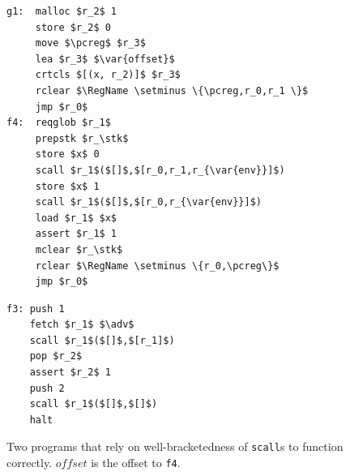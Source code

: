 \documentclass[acmsmall,review]{acmart}\settopmatter{printfolios=true}
\newcommand{\var}[1]{\mathit{#1}}
\newcommand{\pcreg}{\mathrm{pc}}
\newcommand{\adv}{\var{adv}}
\newcommand{\stk}{\var{stk}}
\newcommand{\plaindom}[1]{\mathrm{#1}}
\newcommand{\RegName}{\plaindom{RegName}}
\begin{document}

\begin{figure}[t]
  \centering
  \begin{minipage}[t]{5.05cm}
  \begin{lstlisting}
g1:  malloc $r_2$ 1
     store $r_2$ 0
     move $\pcreg$ $r_3$
     lea $r_3$ $\var{offset}$
     crtcls $[(x, r_2)]$ $r_3$
     rclear $\RegName \setminus \{\pcreg,r_0,r_1 \}$
     jmp $r_0$
f4:  reqglob $r_1$
     prepstk $r_\stk$
     store $x$ 0
     scall $r_1$($[]$,$[r_0,r_1,r_{\var{env}}]$)
     store $x$ 1
     scall $r_1$($[]$,$[r_0,r_{\var{env}}]$)
     load $r_1$ $x$
     assert $r_1$ 1
     mclear $r_\stk$
     rclear $\RegName \setminus \{r_0,\pcreg\}$
     jmp $r_0$
\end{lstlisting}
  \end{minipage}
  \begin{minipage}[t]{3.4cm}
  \begin{lstlisting}
f3: push 1
    fetch $r_1$ $\adv$
    scall $r_1$($[]$,$[r_1]$)
    pop $r_2$
    assert $r_2$ 1
    push 2
    scall $r_1$($[]$,$[]$)
    halt
\end{lstlisting}
  \end{minipage}
  \caption{ Two programs that rely on well-bracketedness of
    \texttt{scall}s to function correctly. $\var{offset}$ is the
    offset to \texttt{f4}.}
  \label{fig:prog-f3-and-g1}
\end{figure}
\end{document}
